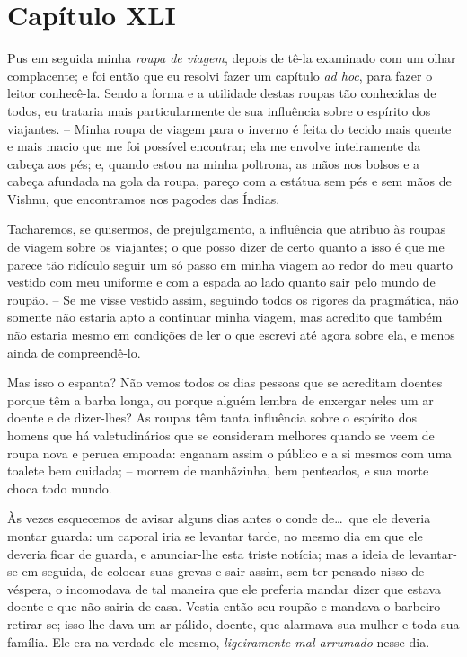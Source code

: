 \section*{Capítulo XLI}

 Pus em seguida minha\textit{ roupa de viagem}, depois de tê-la
examinado com um olhar complacente; e foi então que eu resolvi fazer um
capítulo \textit{ad hoc}, para fazer o leitor conhecê-la. Sendo a forma
e a utilidade destas roupas tão conhecidas de todos, eu trataria mais
particularmente de sua influência sobre o espírito dos viajantes. --
Minha roupa de viagem para o inverno é feita do tecido mais quente e
mais macio que me foi possível encontrar; ela me envolve inteiramente
da cabeça aos pés; e, quando estou na minha poltrona, as mãos nos
bolsos e a cabeça afundada na gola da roupa, pareço com a estátua sem
pés e sem mãos de Vishnu, que encontramos nos pagodes das
Índias. 

 Tacharemos, se quisermos, de prejulgamento, a influência que atribuo às
roupas de viagem sobre os viajantes; o que posso dizer de certo quanto
a isso é que me parece tão ridículo seguir um só passo em minha viagem
ao redor do meu quarto vestido com meu uniforme e com a espada ao lado
quanto sair pelo mundo de roupão. -- Se me visse vestido assim,
seguindo todos os rigores da pragmática, não somente não estaria apto a
continuar minha viagem, mas acredito que também não estaria mesmo em
condições de ler o que escrevi até agora sobre ela, e menos ainda de
compreendê-lo.

 Mas isso o espanta? Não vemos todos os dias pessoas que se acreditam
doentes porque têm a barba longa, ou porque alguém lembra de enxergar
neles um ar doente e de dizer-lhes? As roupas têm tanta influência
sobre o espírito dos homens que há valetudinários que se consideram
melhores quando se veem de roupa nova e peruca empoada: enganam assim o
público e a si mesmos com uma toalete bem cuidada; -- morrem de
manhãzinha, bem penteados, e sua morte choca todo mundo.

 Às vezes esquecemos de avisar alguns dias antes o conde de\ldots\ que ele
deveria montar guarda: um caporal iria se levantar tarde, no mesmo dia
em que ele deveria ficar de guarda, e anunciar-lhe esta triste notícia;
mas a ideia de levantar-se em seguida, de colocar suas grevas e sair
assim, sem ter pensado nisso de véspera, o incomodava de tal maneira
que ele preferia mandar dizer que estava doente e que não sairia de
casa. Vestia então seu roupão e mandava o barbeiro retirar-se; isso lhe
dava um ar pálido, doente, que alarmava sua mulher e toda sua família.
Ele era na verdade ele mesmo, \textit{ligeiramente mal arrumado} nesse dia. 

